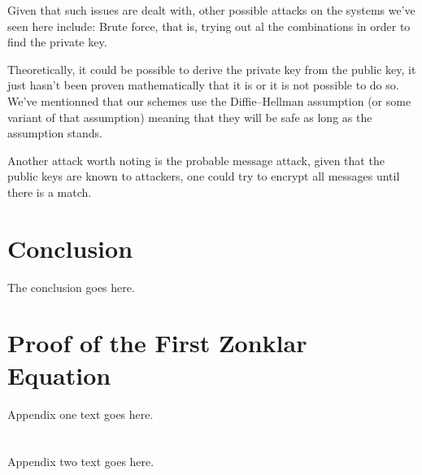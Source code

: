 \documentclass[conference]{IEEEtran}
\begin{document}
Given that such issues are dealt with, other possible attacks on the systems we've seen here include: 
Brute force, that is, trying out al the combinations in order to find the private key.

Theoretically, it could be possible to derive the private key from the public key, it just 
hasn't been proven mathematically that it is or it is not possible to do so.
We've mentionned that our schemes use the Diffie–Hellman assumption (or some variant of that assumption)
meaning that they will be safe as long as the assumption stands.

Another attack worth noting is the probable message attack, given that the public keys are known 
to attackers, one could try to encrypt all messages until there is a match.


\section{Conclusion}
The conclusion goes here.

\appendices
\section{Proof of the First Zonklar Equation}
Appendix one text goes here.

\section{}
Appendix two text goes here.
\end{document}
